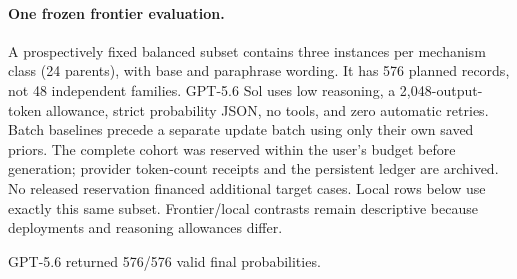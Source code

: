 \begin{center}
\begin{minipage}{\linewidth}
\centering
{}
\label{tab:exp1-fresh-controls}
\small

\end{minipage}
\end{center}

\begin{center}
\begin{minipage}{\linewidth}
\centering
{}
\label{tab:exp1-fresh-edits}
\small

\end{minipage}
\end{center}

\paragraph{One frozen frontier evaluation.}
A prospectively fixed balanced subset contains three instances per mechanism
class (24 parents), with base and paraphrase wording. It has 576 planned records,
not 48 independent families. GPT-5.6 Sol uses low reasoning, a 2,048-output-token
allowance, strict probability JSON, no tools, and zero automatic retries. Batch
baselines precede a separate update batch using only their own saved priors.
The complete cohort was reserved within the user's budget before generation;
provider token-count receipts and the persistent ledger are archived. No released
reservation financed additional target cases. Local rows below use exactly this
same subset. Frontier/local contrasts remain descriptive because deployments and
reasoning allowances differ.

GPT-5.6 returned 576/576 valid final probabilities.

\begin{center}
\begin{minipage}{\linewidth}
\centering
{}
\label{tab:exp1-fresh-frontier}
\small

\end{minipage}
\end{center}

